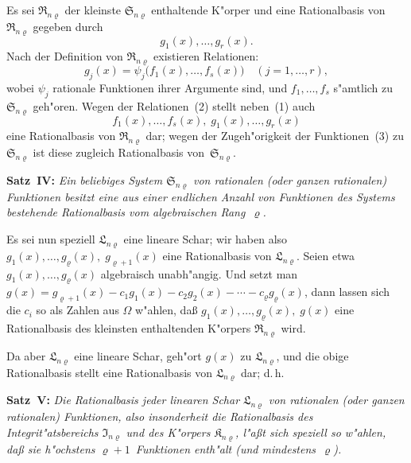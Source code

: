 \documentclass[11pt,a4paper]{article}
\begin{document}
Es sei $\mathfrak{R}_{n\varrho}$ der kleinste $\mathfrak{S}_{n\varrho}$ enthaltende K"{o}rper und eine Rationalbasis von
$\mathfrak{R}_{n\varrho}$ gegeben durch
\begin{equation}
g_{1}(x),\dots,g_{r}(x).
\tag{1}
\end{equation}
Nach der Definition von $\mathfrak{R}_{n\varrho}$ existieren Relationen:
\begin{equation}
g_{j}(x)=\psi_{j}\bigl(f_{1}(x),\dots,f_{s}(x)\bigr)\quad(j=1,\dots,r),
\tag{2}
\end{equation}
wobei $\psi_{j}$ rationale Funktionen ihrer Argumente sind, und $f_{1},\dots,f_{s}$
s"{a}mtlich zu $\mathfrak{S}_{n\varrho}$ geh"{o}ren. Wegen der Relationen~(2) stellt neben~(1) auch
\begin{equation}
f_{1}(x),\dots,f_{s}(x),\;g_{1}(x),\dots,g_{r}(x)
\tag{3}
\end{equation}
eine Rationalbasis von $\mathfrak{R}_{n\varrho}$ dar; wegen der Zugeh"{o}rigkeit der Funktionen~(3)
zu $\mathfrak{S}_{n\varrho}$ ist diese zugleich Rationalbasis von~$\mathfrak{S}_{n\varrho}$.

\medskip
\noindent
\textbf{Satz~IV:} \emph{Ein beliebiges System $\mathfrak{S}_{n\varrho}$ von rationalen (oder ganzen
rationalen) Funktionen besitzt eine aus einer endlichen Anzahl von Funktionen
des Systems bestehende Rationalbasis vom algebraischen Rang~$\varrho$.}

Es sei nun speziell $\mathfrak{L}_{n\varrho}$ eine lineare Schar; wir haben also
$g_{1}(x),\dots,g_{\varrho}(x),\;g_{\varrho+1}(x)$ eine Rationalbasis von $\mathfrak{L}_{n\varrho}$.
Seien etwa $g_{1}(x),\dots,g_{\varrho}(x)$ algebraisch unabh"{a}ngig. Und setzt man
$g(x)=g_{\varrho+1}(x)-c_{1}g_{1}(x)-c_{2}g_{2}(x)-\cdots-c_{\varrho}g_{\varrho}(x)$,
dann lassen sich die $c_{i}$ so als Zahlen aus $\Omega$ w"{a}hlen, da\ss{}
$g_{1}(x),\dots,g_{\varrho}(x),\;g(x)$
eine Rationalbasis des kleinsten enthaltenden K"{o}rpers $\mathfrak{R}_{n\varrho}$ wird.

Da aber $\mathfrak{L}_{n\varrho}$ eine lineare Schar, geh"{o}rt $g(x)$ zu $\mathfrak{L}_{n\varrho}$, und die obige
Rationalbasis stellt eine Rationalbasis von $\mathfrak{L}_{n\varrho}$ dar; d.\,h.

\medskip
\noindent
\textbf{Satz~V:} \emph{Die Rationalbasis jeder linearen Schar $\mathfrak{L}_{n\varrho}$ von rationalen
(oder ganzen rationalen) Funktionen, also insonderheit die Rationalbasis
des Integrit"{a}tsbereichs $\mathfrak{I}_{n\varrho}$ und des K"{o}rpers $\mathfrak{K}_{n\varrho}$, l"{a}\ss{}t sich speziell so
w"{a}hlen, da\ss{} sie h"{o}chstens $\varrho+1$~Funktionen enth"{a}lt (und mindestens~$\varrho$).}
\end{document}
